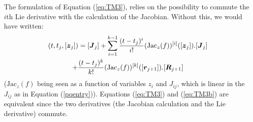 \documentclass{sig-alternate-05-2015} %
\newcommand\ForAuthors[1]%
 {\par\smallskip                     %
  \begin{center}%
   \fbox%
   {\parbox{0.9\linewidth}%
    {\raggedright\sc--- #1}%
   }%
  \end{center}%
  \par\smallskip                     %
 }
\newtheorem{remark}{Remark}
\begin{document}
The formulation of Equation (\ref{eq:TM3}), 
relies on the possibility to commute the $i$th Lie derivative
with the calculation of the Jacobian. Without this, we would have written:
\begin{multline}
[\J](t,t_j,[{\z}_j]) = [{\J}_j] + \sum\limits_{i=1}^{k-1} \frac{(t-t_j)^i}{i !} (\mbox{Jac}_z(f))^{[i]}([{\z}_{j}]).[{\J}_j] \\ +  \frac{(t-t_j)^k}{k !} (\mbox{Jac}_z(f))^{[k]}([{\r}_{j+1}]).[\bfm{R}_{j+1}]
\label{eq:TM3b}
\end{multline}
\noindent ($\mbox{Jac}_z(f)$ being seen as a function of variables $z_i$ and $J_{ij}$, which 
is linear in the $J_{ij}$ as in Equation (\ref{pqentry})). 
Equations (\ref{eq:TM3}) and (\ref{eq:TM3b}) are equivalent since the two derivatives (the Jacobian calculation
and the Lie derivative) commute.  
\end{document}
